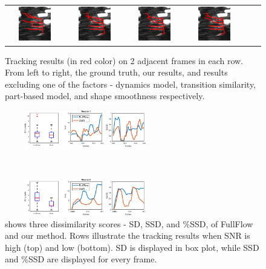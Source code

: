 \documentclass{article}
\begin{document}
\begin{figure}[t!]
\begin{tabular}{cccccc}
		{\includegraphics[height=1.5cm,width=2.3cm]{img/dyna_t3.png}} &
		{\includegraphics[height=1.5cm,width=2.3cm]{img/tran_t3.png}} &  
		{\includegraphics[height=1.5cm,width=2.3cm]{img/repul_t3.png}} &  
		{\includegraphics[height=1.5cm,width=2.3cm]{img/shape_t3.png}}  \\
	\end{tabular}
	\vspace{-10pt}
	\caption{\small{Tracking results (in red color) on 2 adjacent frames in each row. From left to right, the ground truth, our results, and results excluding one of the factors - dynamics model, transition similarity, part-based model, and shape smoothness respectively. }}
	\label{fig:factors}
	\vspace{-10pt}
\end{figure}

\begin{figure}[b!]
	\vspace{-10pt}
	\centering
	\begin{minipage}[b]{\linewidth}
		\centerline{\includegraphics[height=1.6cm,width=7cm]{img/boxplot_n1.png}}
	\end{minipage}\\
	\begin{minipage}[b]{\linewidth}
		\centerline{\includegraphics[height=1.6cm,width=7cm]{img/boxplot_n2.png}}
	\end{minipage}
	\vspace{-20pt}
	\caption{\small{shows three dissimilarity scores - SD, SSD, and \%SSD, of FullFlow \cite{Chen2016} and our method. Rows illustrate the tracking results when SNR is high (top) and low (bottom). SD is displayed in box plot, while SSD and \%SSD are displayed for every frame.}}
	\label{fig:neuronstat}
	\vspace{-10pt}
\end{figure}
\end{document}
